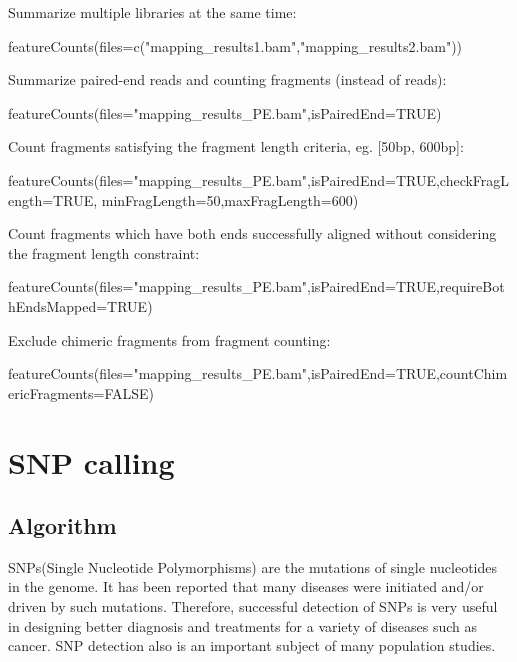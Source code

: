 \documentclass[12pt]{report}
\begin{document}
\noindent Summarize multiple libraries at the same time:

\begin{Rcode}
featureCounts(files=c("mapping_results1.bam","mapping_results2.bam"))
\end{Rcode}

\noindent Summarize paired-end reads and counting fragments (instead of reads):

\begin{Rcode}
featureCounts(files="mapping_results_PE.bam",isPairedEnd=TRUE)
\end{Rcode}

\noindent Count fragments satisfying the fragment length criteria, eg. [50bp, 600bp]:

\begin{Rcode}
featureCounts(files="mapping_results_PE.bam",isPairedEnd=TRUE,checkFragLength=TRUE,
minFragLength=50,maxFragLength=600)
\end{Rcode}

\noindent Count fragments which have both ends successfully aligned without considering the fragment length constraint:

\begin{Rcode}
featureCounts(files="mapping_results_PE.bam",isPairedEnd=TRUE,requireBothEndsMapped=TRUE)
\end{Rcode}

\noindent Exclude chimeric fragments from fragment counting:

\begin{Rcode}
featureCounts(files="mapping_results_PE.bam",isPairedEnd=TRUE,countChimericFragments=FALSE)
\end{Rcode}

\chapter{SNP calling}

\section{Algorithm}

SNPs(Single Nucleotide Polymorphisms) are the mutations of single nucleotides in the genome.
It has been reported that many diseases were initiated and/or driven by such mutations.
Therefore, successful detection of SNPs is very useful in designing better diagnosis and treatments for a variety of diseases such as cancer.
SNP detection also is an important subject of many population studies.
\end{document}
